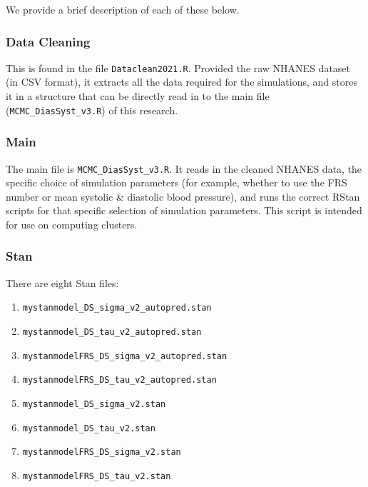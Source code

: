 \documentclass[
]{article}
\providecommand{\tightlist}{%
  \setlength{\itemsep}{0pt}\setlength{\parskip}{0pt}}
\begin{document}
We provide a brief description of each of these below.

\hypertarget{data-cleaning}{%
\subsubsection{Data Cleaning}\label{data-cleaning}}

This is found in the file \texttt{Dataclean2021.R}. Provided the raw NHANES dataset (in CSV format), it extracts all the data required for the simulations, and stores it in a structure that can be directly read in to the main file (\texttt{MCMC\_DiasSyst\_v3.R}) of this research.

\hypertarget{main}{%
\subsubsection{Main}\label{main}}

The main file is \texttt{MCMC\_DiasSyst\_v3.R}. It reads in the cleaned NHANES data, the specific choice of simulation parameters (for example, whether to use the FRS number or mean systolic \& diastolic blood pressure), and runs the correct RStan scripts for that specific selection of simulation parameters. This script is intended for use on computing clusters.

\hypertarget{stan}{%
\subsubsection{Stan}\label{stan}}

There are eight Stan files:

\begin{enumerate}
\def\labelenumi{\arabic{enumi}.}
\tightlist
\item
  \texttt{mystanmodel\_DS\_sigma\_v2\_autopred.stan}
\item
  \texttt{mystanmodel\_DS\_tau\_v2\_autopred.stan}
\item
  \texttt{mystanmodelFRS\_DS\_sigma\_v2\_autopred.stan}
\item
  \texttt{mystanmodelFRS\_DS\_tau\_v2\_autopred.stan}
\item
  \texttt{mystanmodel\_DS\_sigma\_v2.stan}
\item
  \texttt{mystanmodel\_DS\_tau\_v2.stan}
\item
  \texttt{mystanmodelFRS\_DS\_sigma\_v2.stan}
\item
  \texttt{mystanmodelFRS\_DS\_tau\_v2.stan}
\end{enumerate}
\end{document}
